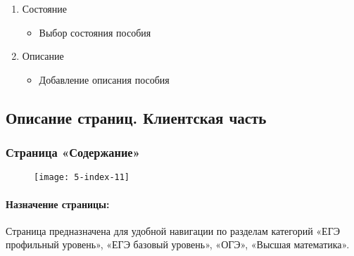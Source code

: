\begin{enumerate}
\begin{enumerate}
\begin{enumerate}
			\item Состояние
			\begin{itemize}
				\item Выбор состояния пособия
			\end{itemize}

			\item Описание
			\begin{itemize}
				\item Добавление описания пособия
			\end{itemize}

		\end{enumerate}
	\end{enumerate}
\end{enumerate}


\subsection{Описание страниц. Клиентская часть}

\subsubsection{Страница «Содержание»}
\begin{figure}[H]
\texttt{[image: 5-index-11]}
\end{figure}

\paragraph{Назначение страницы:} Страница предназначена для удобной навигации по разделам категорий «ЕГЭ профильный уровень», «ЕГЭ базовый уровень», «ОГЭ», «Высшая математика».

